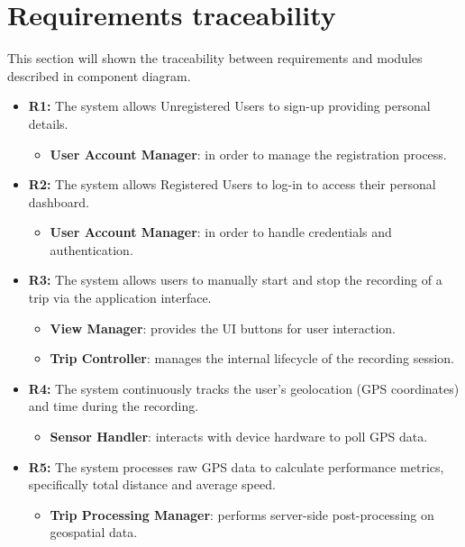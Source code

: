 \section{Requirements traceability}
This section will shown the traceability between requirements and modules described in component diagram.

\begin{itemize}
    \item \textbf{R1:} The system allows Unregistered Users to sign-up providing personal details.
          \begin{itemize}
              \item \textbf{User Account Manager}: in order to manage the registration process.
          \end{itemize}
    \item \textbf{R2:} The system allows Registered Users to log-in to access their personal dashboard.
          \begin{itemize}
              \item \textbf{User Account Manager}: in order to handle credentials and authentication.
          \end{itemize}
    \item \textbf{R3:} The system allows users to manually start and stop the recording of a trip via the application interface.
          \begin{itemize}
              \item \textbf{View Manager}: provides the UI buttons for user interaction.
              \item \textbf{Trip Controller}: manages the internal lifecycle of the recording session.
          \end{itemize}
    \item \textbf{R4:} The system continuously tracks the user’s geolocation (GPS coordinates) and time during the recording.
          \begin{itemize}
              \item \textbf{Sensor Handler}: interacts with device hardware to poll GPS data.
          \end{itemize}
    \item \textbf{R5:} The system processes raw GPS data to calculate performance metrics, specifically total distance and average speed.
          \begin{itemize}
              \item \textbf{Trip Processing Manager}: performs server-side post-processing on geospatial data.

\end{itemize}
\end{itemize}
